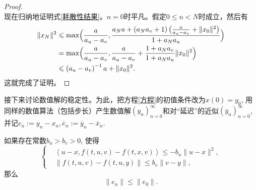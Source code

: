 \begin{proof}
\begin{equation*}
    \end{equation*}
    现在归纳地证明式\eqref{耗散性结果}。$n=0$时平凡。假定$0\leqslant n<N$时成立，然后有
    \begin{align*}
        \|x_N\|^2 &\leqslant \max\Bigl(\frac{a}{a_u-a_v}, \frac{a_Na+\left(a_Na_v+1\right)\bigl(\frac{a}{a_u-a_v}+\|x_0\|^2\bigr)}{1+a_Na_u}\Bigr)
        \\ &= \max\Bigl(\frac{a}{a_u-a_v}, \frac{a}{a_u-a_v}+\frac{1+a_Na_v}{1+a_Na_u}\|x_0\|^2\Bigr)
        \\ &\leqslant \left(a_u-a_v\right)^{-1}a+\|x_0\|^2.
    \end{align*}
    这就完成了证明。
\end{proof}

接下来讨论数值解的稳定性。为此，把方程\eqref{方程}的初值条件改为$x(0)=y_0$, 用同样的数值算法（包括步长）产生数值解$\left(y_n\right)_{n=0}^\infty$和对“延迟”的近似$\left(\overline y_n\right)_{n=0}^\infty$, 并记$e_n:=y_n-x_n, \overline e_n:=\overline y_n-\overline x_n$.
\begin{theorem}
    如果存在常数$b_u>b_v>0$, 使得
    \begin{equation*}
        \left\{
            \begin{aligned}
                &\left<u-x,f(t,u,v)-f(t,x,v)\right>\leqslant -b_u \|u-x\|^2,
                \\ &\|f(t,u,v)-f(t,u,y)\|\leqslant b_v \|v-y\|,
            \end{aligned}
        \right.
    \end{equation*}
    那么
    \begin{equation*}
        \|e_n\|\leqslant \|e_0\|.
    \end{equation*}
\end{theorem}
